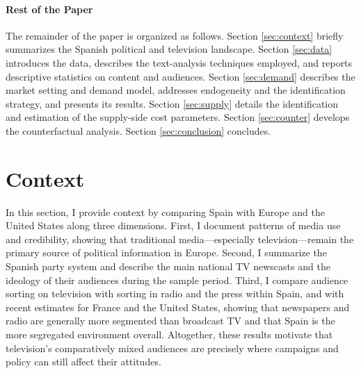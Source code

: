 \documentclass[12pt]{article}
\begin{document}

\paragraph{Rest of the Paper}

The remainder of the paper is organized as follows. Section \ref{sec:context} briefly summarizes the Spanish political and television landscape. Section \ref{sec:data} introduces the data, describes the text-analysis techniques employed, and reports descriptive statistics on content and audiences. Section \ref{sec:demand} describes the market setting and demand model, addresses endogeneity and the identification strategy, and presents its results. Section \ref{sec:supply} details the identification and estimation of the supply-side cost parameters. Section \ref{sec:counter} develops the counterfactual analysis. Section \ref{sec:conclusion} concludes.

	
	
	\section{Context}
	
In this section, I provide context by comparing Spain with Europe and the United States along three dimensions. First, I document patterns of media use and credibility, showing that traditional media—especially television—remain the primary source of political information in Europe. Second, I summarize the Spanish party system and describe the main national TV newscasts and the ideology of their audiences during the sample period. Third, I compare audience sorting on television with sorting in radio and the press within Spain, and with recent estimates for France and the United States, showing that newspapers and radio are generally more segmented than broadcast TV and that Spain is the more segregated environment overall. Altogether, these results motivate that television’s comparatively mixed audiences are precisely where campaigns and policy can still affect their attitudes.
\end{document}
